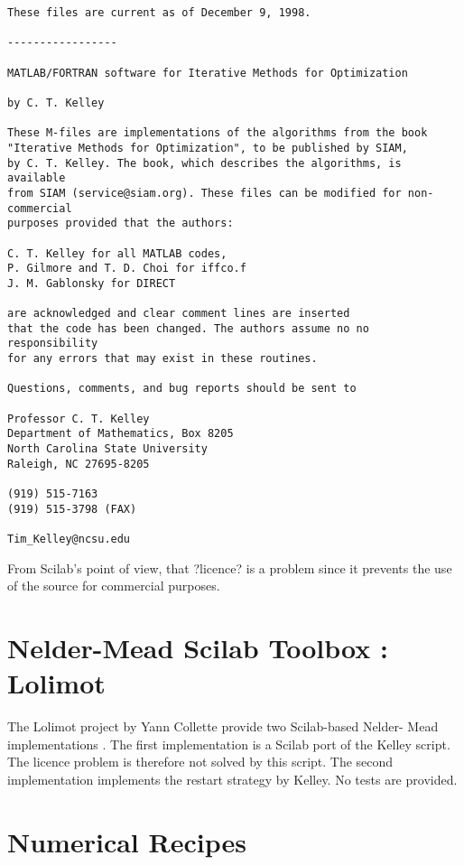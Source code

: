 \begin{verbatim}
These files are current as of December 9, 1998.

-----------------

MATLAB/FORTRAN software for Iterative Methods for Optimization

by C. T. Kelley

These M-files are implementations of the algorithms from the book
"Iterative Methods for Optimization", to be published by SIAM,
by C. T. Kelley. The book, which describes the algorithms, is available
from SIAM (service@siam.org). These files can be modified for non-commercial
purposes provided that the authors: 

C. T. Kelley for all MATLAB codes, 
P. Gilmore and T. D. Choi for iffco.f
J. M. Gablonsky for DIRECT

are acknowledged and clear comment lines are inserted
that the code has been changed. The authors assume no no responsibility
for any errors that may exist in these routines.

Questions, comments, and bug reports should be sent to

Professor C. T. Kelley
Department of Mathematics, Box 8205
North Carolina State University
Raleigh, NC 27695-8205

(919) 515-7163
(919) 515-3798 (FAX)

Tim_Kelley@ncsu.edu

\end{verbatim}


From Scilab's point of view, that ?licence? is a problem since it 
prevents the use of the source for commercial purposes.

\section{Nelder-Mead Scilab Toolbox : Lolimot}

The Lolimot project by Yann Collette provide two Scilab-based Nelder-
Mead implementations \cite{LolimotColletteURL}. The first implementation is a Scilab port of 
the Kelley script. The licence problem is therefore not solved by this 
script. The second implementation \cite{NelderMeadColletteURL} implements the restart strategy 
by Kelley. No tests are provided.

\section{Numerical Recipes}

